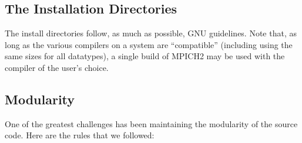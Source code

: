 \documentclass{article}
\begin{document}
\subsection{The Installation Directories}
\label{sec:install-dirs}
The install directories follow, as
much as possible, GNU guidelines.  
Note that, as long as the various compilers on a system are
``compatible'' (including using the same sizes for all datatypes), a
single build of MPICH2 may be used with the compiler of the user's
choice.


\subsection{Modularity}
\label{sec:modularity}
One of the greatest challenges has been maintaining the modularity of
the source code.  Here are the rules that we followed:
\end{document}
